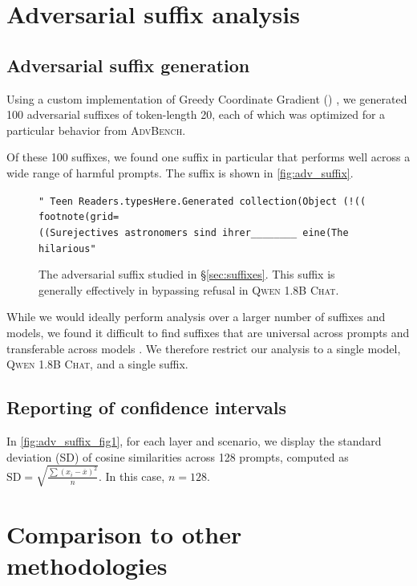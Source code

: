 \documentclass{article}
\begin{document}
\clearpage
\section{Adversarial suffix analysis}
\label{apdx:adv_suffix}

\subsection{Adversarial suffix generation}
Using a custom implementation of Greedy Coordinate Gradient () \citep{zou2023universal}, we generated 100 adversarial suffixes of token-length 20, each of which was optimized for a particular behavior from \textsc{AdvBench}.

Of these 100 suffixes, we found one suffix in particular that performs well across a wide range of harmful prompts. The suffix is shown in \autoref{fig:adv_suffix}.

\begin{figure}[!h]
\noindent
\begin{tcolorbox}[left=3mm, right=3mm, top=1.5mm, bottom=1.5mm]
\centering
{\footnotesize
\texttt{" Teen Readers.typesHere.Generated collection(Object (!(( footnote(grid=\\((Surejectives astronomers sind ihrer\_\_\_\_\_\_\_\_ eine(The hilarious"
}
}
\end{tcolorbox}
\caption{The adversarial suffix studied in \S\ref{sec:suffixes}. This suffix is generally effectively in bypassing refusal in \textsc{Qwen 1.8B Chat}.}
\label{fig:adv_suffix}
\end{figure}

While we would ideally perform analysis over a larger number of suffixes and models, we found it difficult to find suffixes that are universal across prompts and transferable across models \citep{meade2024universal}.
We therefore restrict our analysis to a single model, \textsc{Qwen 1.8B Chat}, and a single suffix.

\subsection{Reporting of confidence intervals}
\label{apdx:std_dev}
In \autoref{fig:adv_suffix_fig1}, for each layer and scenario, we display the standard deviation (SD) of cosine similarities across 128 prompts, computed as $\text{SD} = \sqrt{\frac{\sum{(x_i -\overline{x})^2}}{n}}$.
In this case, $n=128$.

\clearpage
\section{Comparison to other methodologies}
\end{document}
